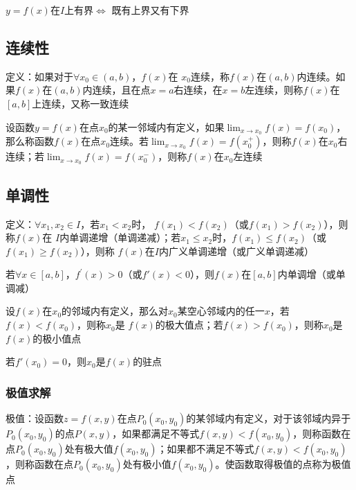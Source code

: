 \documentclass[12pt]{book}
\begin{document}
$y=f(x)$在$I$上有界$\Leftrightarrow$ 既有上界又有下界

\subsection{连续性}

定义：如果对于$\forall x_0\in (a,b)$，$f(x)$在 $x_0$连续，称$f(x)$在$(a,b)$内连续。如果$f(x)$在$(a,b)$内连续，且在点$x=a$右连续，在$x=b$左连续，则称$f(x)$在$[a,b]$上连续，又称一致连续

设函数$y=f(x)$在点$x_0$的某一邻域内有定义，如果$\lim_{x\rightarrow x_0}{f(x)}= f(x_0)$，那么称函数$f(x)$在点$x_0$连续。若$\lim_{x\rightarrow x_0}{f(x)}= f(x_0^+)$，则称$f(x)$在$x_0$右连续；若$\lim_{x\rightarrow x_0}{f(x)}= f(x_0^-)$，则称$f(x)$在$x_0$左连续

\subsection{单调性}

定义：$\forall x_1, x_2\in I$，若$x_1<x_2$时， $f(x_1)<f(x_2)$（或$f(x_1)>f(x_2)$），则称$f(x)$在 $I$内单调递增（单调递减）；若$x_1\leq x_2$时，$f(x_1)\leq f(x_2)$（或$f(x_1)\geq f(x_2)$），则称 $f(x)$在$I$内广义单调递增（或广义单调递减）

若$\forall x\in[a,b]$，$f^\prime(x)>0$（或$f'(x)<0$），则$f(x)$在$[a,b]$内单调增（或单调减）

设$ f(x)$在$x_0$的邻域内有定义，那么对$x_0$某空心邻域内的任一$x$，若$f(x)< f(x_0)$，则称$x_0$是 $f(x)$的极大值点；若$f(x)> f(x_0)$，则称$x_0$是 $f(x)$的极小值点

若$f'(x_0)=0$，则$x_0$是$f(x)$的驻点



\subsubsection{极值求解}


极值：设函数$z=f(x,y)$在点$P_{0}(x_0,y_0)$的某邻域内有定义，对于该邻域内异于$P_{0}(x_0,y_0)$的点$P(x,y)$，如果都满足不等式$f(x,y)<f(x_0,y_0)$，则称函数在点$P_{0}(x_0,y_0)$处有极大值$f(x_0,y_0)$；如果都不满足不等式$f(x,y)<f(x_0,y_0)$，则称函数在点$P_{0}(x_0,y_0)$处有极小值$f(x_0,y_0)$。使函数取得极值的点称为极值点
\end{document}
